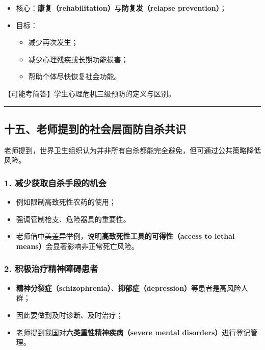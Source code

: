 \documentclass[
  chinese,
  9pt,
  a4paper,
]{ctexart}
\providecommand{\tightlist}{%
  \setlength{\itemsep}{0pt}\setlength{\parskip}{0pt}}
\begin{document}
\begin{itemize}
\item
  核心：\textbf{康复（rehabilitation）}与\textbf{防复发（relapse
  prevention）}；
\item
  目标：

  \begin{itemize}
  \tightlist
  \item
    减少再次发生；
  \item
    减少心理残疾或长期功能损害；
  \item
    帮助个体尽快恢复社会功能。
  \end{itemize}
\end{itemize}

【可能考简答】学生心理危机三级预防的定义与区别。

\begin{center}\rule{0.5\linewidth}{0.5pt}\end{center}

\subsection{十五、老师提到的社会层面防自杀共识}\label{ux5341ux4e94ux8001ux5e08ux63d0ux5230ux7684ux793eux4f1aux5c42ux9762ux9632ux81eaux6740ux5171ux8bc6}

老师提到，世界卫生组织认为并非所有自杀都能完全避免，但可通过公共策略降低风险。

\subsubsection{1.
减少获取自杀手段的机会}\label{ux51cfux5c11ux83b7ux53d6ux81eaux6740ux624bux6bb5ux7684ux673aux4f1a}

\begin{itemize}
\tightlist
\item
  例如限制高致死性农药的使用；
\item
  强调管制枪支、危险器具的重要性。
\item
  老师借中美差异举例，说明\textbf{高致死性工具的可得性（access to lethal
  means）}会显著影响非正常死亡风险。
\end{itemize}

\subsubsection{2.
积极治疗精神障碍患者}\label{ux79efux6781ux6cbbux7597ux7cbeux795eux969cux788dux60a3ux8005}

\begin{itemize}
\tightlist
\item
  \textbf{精神分裂症（schizophrenia）}、\textbf{抑郁症（depression）}等患者是高风险人群；
\item
  因此要做到及时诊断、及时治疗；
\item
  老师提到我国对\textbf{六类重性精神疾病（severe mental
  disorders）}进行登记管理。
\end{itemize}
\end{document}
